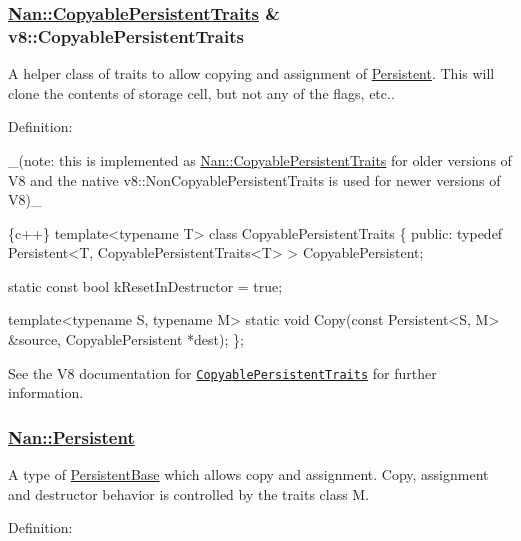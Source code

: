 \label{_api_nan_copyable_persistent_traits}%
 \subsubsection*{\hyperlink{struct_nan_1_1_copyable_persistent_traits}{Nan\+::\+Copyable\+Persistent\+Traits} \& v8\+::\+Copyable\+Persistent\+Traits}

A helper class of traits to allow copying and assignment of {\ttfamily \hyperlink{class_persistent}{Persistent}}. This will clone the contents of storage cell, but not any of the flags, etc..

Definition\+:

\+\_\+(note\+: this is implemented as {\ttfamily \hyperlink{struct_nan_1_1_copyable_persistent_traits}{Nan\+::\+Copyable\+Persistent\+Traits}} for older versions of V8 and the native {\ttfamily v8\+::\+Non\+Copyable\+Persistent\+Traits} is used for newer versions of V8)\+\_\+


\begin{DoxyCode}
\{c++\}
template<typename T>
class CopyablePersistentTraits \{
 public:
  typedef Persistent<T, CopyablePersistentTraits<T> > CopyablePersistent;

  static const bool kResetInDestructor = true;

  template<typename S, typename M>
  static void Copy(const Persistent<S, M> &source,
                   CopyablePersistent *dest);
\};
\end{DoxyCode}


See the V8 documentation for \href{https://v8docs.nodesource.com/io.js-3.0/da/d5c/structv8_1_1_copyable_persistent_traits.html}{\tt {\ttfamily Copyable\+Persistent\+Traits}} for further information.

\label{_api_nan_persistent}%
 \subsubsection*{\hyperlink{class_nan_1_1_persistent}{Nan\+::\+Persistent}}

A type of {\ttfamily \hyperlink{class_persistent_base}{Persistent\+Base}} which allows copy and assignment. Copy, assignment and destructor behavior is controlled by the traits class {\ttfamily M}.

Definition\+:


